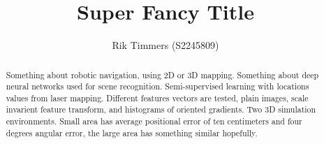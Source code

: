 \documentclass[a4paper,10pt]{article}
\title{Super Fancy Title}
\author{Rik Timmers (S2245809)}
\begin{document}
\maketitle

\begin{abstract}
Something about robotic navigation, using 2D or 3D mapping. 
Something about deep neural networks used for scene recognition. 
Semi-supervised learning with locations values from laser mapping. 
Different features vectors are tested, plain images, scale invarient feature transform, and histograms of oriented gradients. 
Two 3D simulation environments. Small area has average positional error of ten centimeters and four degrees angular error, the large area has something similar hopefully.
\end{abstract}



\end{document}

